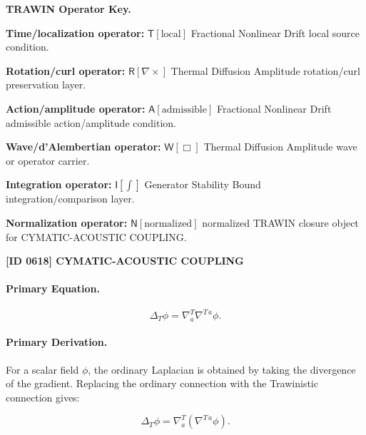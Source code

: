 \par\vspace{0.45\baselineskip}
\noindent\begin{minipage}[t]{\linewidth}
\begingroup
\small
\raggedright
\textbf{TRAWIN Operator Key.}\par
\noindent\textbf{Time/localization operator:} $\mathsf{T}\!\left[\mathrm{local}\right]$ Fractional Nonlinear Drift local source condition.\par
\noindent\textbf{Rotation/curl operator:} $\mathsf{R}\!\left[\nabla\times\right]$ Thermal Diffusion Amplitude rotation/curl preservation layer.\par
\noindent\textbf{Action/amplitude operator:} $\mathsf{A}\!\left[\mathrm{admissible}\right]$ Fractional Nonlinear Drift admissible action/amplitude condition.\par
\noindent\textbf{Wave/d'Alembertian operator:} $\mathsf{W}\!\left[\Box\right]$ Thermal Diffusion Amplitude wave or operator carrier.\par
\noindent\textbf{Integration operator:} $\mathsf{I}\!\left[\int\right]$ Generator Stability Bound integration/comparison layer.\par
\noindent\textbf{Normalization operator:} $\mathsf{N}\!\left[\mathrm{normalized}\right]$ normalized TRAWIN closure object for CYMATIC-ACOUSTIC COUPLING.\par
\endgroup
\end{minipage}

\clearpage
\noindent\textbf{[ID 0618] CYMATIC-ACOUSTIC COUPLING}\par
\vspace{0.35em}
\paragraph{Primary Equation.}
\begin{equation}
\Delta_T\phi
=
\nabla^{T}_{a}\nabla^{T\,a}\phi .
\end{equation}

\paragraph{Primary Derivation.}
For a scalar field $\phi$, the ordinary Laplacian is obtained by taking the divergence of the gradient.  
Replacing the ordinary connection with the Trawinistic connection gives:

\begin{equation}
\Delta_T\phi
=
\nabla^{T}_{a}
\left(
\nabla^{T\,a}\phi
\right).
\end{equation}

